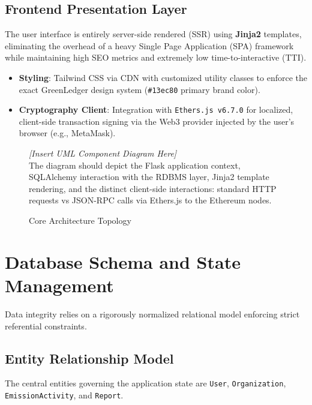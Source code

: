 \documentclass[12pt,a4paper]{article}
\begin{document}
\subsection{Frontend Presentation Layer}
The user interface is entirely server-side rendered (SSR) using \textbf{Jinja2} templates, eliminating the overhead of a heavy Single Page Application (SPA) framework while maintaining high SEO metrics and extremely low time-to-interactive (TTI).
\begin{itemize}[noitemsep]
    \item \textbf{Styling}: Tailwind CSS via CDN with customized utility classes to enforce the exact GreenLedger design system (\texttt{\#13ec80} primary brand color).
    \item \textbf{Cryptography Client}: Integration with \texttt{Ethers.js v6.7.0} for localized, client-side transaction signing via the Web3 provider injected by the user's browser (e.g., MetaMask).
\end{itemize}

\begin{figure}[H]
    \centering
    \begin{tcolorbox}[colback=gray!5!white,colframe=gray!50!black,width=0.9\textwidth,halign=center,valign=center,height=6cm]
    \textit{[Insert UML Component Diagram Here]} \\
    \vspace{0.5cm}
    \footnotesize The diagram should depict the Flask application context, SQLAlchemy interaction with the RDBMS layer, Jinja2 template rendering, and the distinct client-side interactions: standard HTTP requests vs JSON-RPC calls via Ethers.js to the Ethereum nodes.
    \end{tcolorbox}
    \caption{Core Architecture Topology}
    \label{fig:architecture}
\end{figure}

\section{Database Schema and State Management}

Data integrity relies on a rigorously normalized relational model enforcing strict referential constraints.

\subsection{Entity Relationship Model}
The central entities governing the application state are \texttt{User}, \texttt{Organization}, \texttt{EmissionActivity}, and \texttt{Report}.
\end{document}
